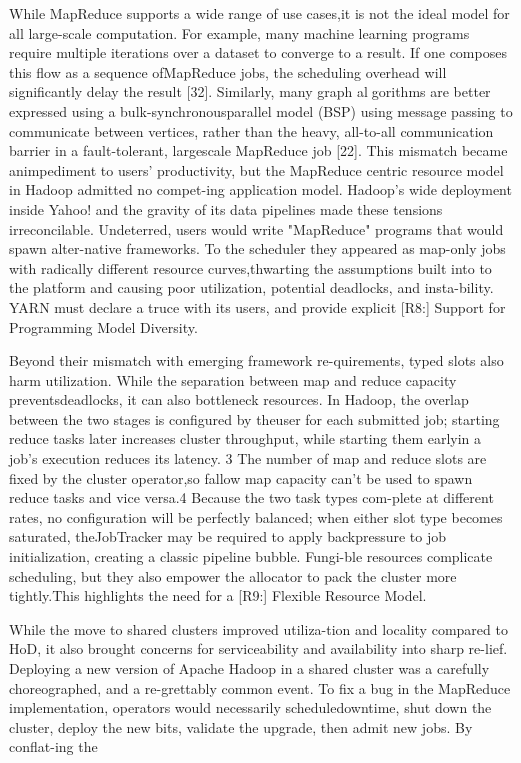 While MapReduce supports a wide range of use cases,it is not the ideal model
for all large-scale computation.
For example, many machine learning programs require multiple iterations over a
dataset to converge to a result. 
If one composes this flow as a sequence ofMapReduce jobs, the scheduling
overhead will significantly delay the result [32]. 
Similarly, many graph algorithms are better expressed using a
bulk-synchronousparallel model (BSP) using message passing to communicate
between vertices, rather than the heavy, all-to-all communication barrier in a
fault-tolerant, largescale MapReduce job [22]. 
This mismatch became animpediment to users' productivity, but the
MapReduce centric resource model in Hadoop admitted no compet-ing application
model. 
Hadoop's wide deployment inside Yahoo! and the gravity of its data pipelines
made these tensions irreconcilable. Undeterred, users would write "MapReduce"
programs that would spawn alter-native frameworks. To the scheduler they
appeared as map-only jobs with radically different resource curves,thwarting
the assumptions built into to the platform and causing poor utilization,
potential deadlocks, and insta-bility. 
YARN must declare a truce with its users, and provide explicit [R8:] Support
for Programming Model Diversity.

Beyond their mismatch with emerging framework re-quirements, typed slots also
harm utilization. 
While the separation between map and reduce capacity preventsdeadlocks, it can
also bottleneck resources.
 In Hadoop, the overlap between the two stages is configured by theuser for each
submitted job; starting reduce tasks later increases cluster throughput, while
starting them earlyin a job's execution reduces its latency.
3 The number of map
and reduce slots are fixed by the cluster operator,so fallow map capacity can't be used to spawn reduce tasks and vice versa.4 Because the two task types com-plete at different rates, no configuration will be perfectly
balanced; when either slot type becomes saturated, theJobTracker may be required to apply backpressure to job
initialization, creating a classic pipeline bubble. Fungi-ble resources complicate scheduling, but they also empower the allocator to pack the cluster more tightly.This highlights the need for a [R9:] Flexible Resource
Model.

While the move to shared clusters improved utiliza-tion and locality compared to HoD, it also brought concerns for serviceability and availability into sharp re-lief. Deploying a new version of Apache Hadoop in a
shared cluster was a carefully choreographed, and a re-grettably common event. To fix a bug in the MapReduce
implementation, operators would necessarily scheduledowntime, shut down the cluster, deploy the new bits,
validate the upgrade, then admit new jobs. By conflat-ing the

